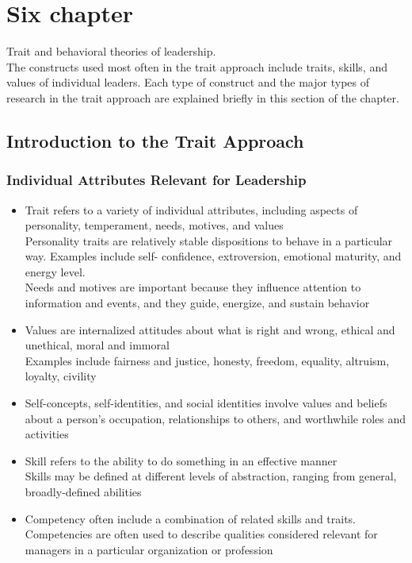 

\section{Six chapter}
Trait and behavioral theories of leadership.
\\The constructs used most often in the trait approach include traits, skills, and values of individual leaders. Each type of construct and the major types of research in the trait approach are explained briefly in this section of the chapter.

\subsection{Introduction to the Trait Approach} %
\label{sub:introduction_to_the_trait_approach}

\subsubsection{Individual Attributes Relevant for Leadership} %
\label{ssub:individual_attributes_relevant_for_leadership}

\begin{itemize}
	\item Trait refers to a variety of individual attributes, including aspects of personality, temperament, needs, motives, and values
		\\Personality traits are relatively stable dispositions to behave in a particular way. Examples include self- confidence, extroversion, emotional maturity, and energy level.
		\\Needs and motives are important because they influence attention to information and events, and they guide, energize, and sustain behavior
	\item Values are internalized attitudes about what is right and wrong, ethical and unethical, moral and immoral
	\\Examples include fairness and justice, honesty, freedom, equality, altruism, loyalty, civility
	\item Self-concepts, self-identities, and social identities involve values and beliefs about a person’s occupation, relationships to others, and worthwhile roles and activities
	\item Skill refers to the ability to do something in an effective manner
	\\Skills may be defined at different levels of abstraction, ranging from general, broadly-defined abilities
	\item Competency often include a combination of related skills and traits. Competencies are often used to describe qualities considered relevant for managers in a particular organization or profession
\end{itemize}


